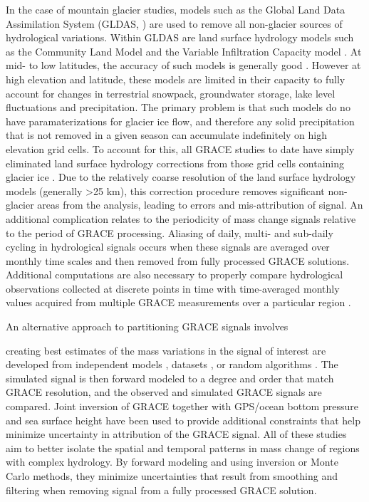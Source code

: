 \documentclass[review,oneside]{igs}
\begin{document}
 In the case of mountain glacier studies, models such as the Global Land Data Assimilation System (GLDAS, \citep{rodell_global_2004}) are used to remove all non-glacier sources of hydrological variations. Within GLDAS are land surface hydrology models such as the Community Land Model \citep{oleson2010technical} and the Variable Infiltration Capacity model \citep{liang1994simple}. At mid- to low latitudes, the accuracy of such models is generally good \citep[e.g.][]{werth_integration_2009}. However at high elevation and latitude, these models are limited in their capacity to fully account for changes in terrestrial snowpack, groundwater storage, lake level fluctuations and precipitation. The primary problem is that such models do no have paramaterizations for glacier ice flow, and therefore any solid precipitation that is not removed in a given season can accumulate indefinitely on high elevation grid cells. To account for this, all GRACE studies to date have simply eliminated land surface hydrology corrections from those grid cells containing glacier ice \citep[e.g.][]{gardner_sharply_2011,jacob_recent_2012,luthcke_antarctica_2013}. Due to the relatively coarse resolution of the land surface hydrology models (generally >25 km), this correction procedure removes significant non-glacier areas from the analysis, leading to errors and mis-attribution of signal. An additional complication relates to the periodicity of mass change signals relative to the period of GRACE processing. Aliasing of daily, multi- and sub-daily cycling in hydrological signals occurs when these signals are averaged over monthly time scales and then removed from fully processed GRACE solutions. Additional computations are also necessary to properly compare hydrological observations collected at discrete points in time with time-averaged monthly values acquired from multiple GRACE measurements over a particular region \citep{swenson_estimating_2006,hill_spatial_2015}. 

An alternative approach to partitioning GRACE signals involves 

creating best estimates of the mass variations in the signal of interest are developed from independent models \citep{beamer_high-resolution_2016}, datasets \citep{sasgen_towards_2012}, or random algorithms \citep{gardner_sharply_2011,colgan_constraining_2013}. The simulated signal is then forward modeled to a degree and order that match GRACE resolution, and the observed and simulated GRACE signals are compared. Joint inversion of GRACE together with GPS/ocean bottom pressure \citep{wu_simultaneous_2010} and sea surface height \citep{jensen_land_2013} have been used to provide additional constraints that help minimize uncertainty in attribution of the GRACE signal. All of these studies aim to better isolate the spatial and temporal patterns in mass change of regions with complex hydrology. By forward modeling and using inversion or Monte Carlo methods, they minimize uncertainties that result from smoothing and filtering when removing signal from a fully processed GRACE solution.
\end{document}
